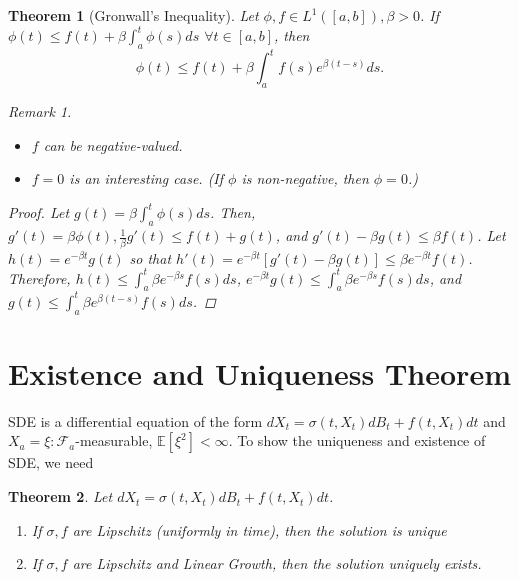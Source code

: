 \documentclass[12pt]{report}
\newcommand{\F}{\mathcal{F}}
\newcommand{\E}{\mathbb{E}}
\renewcommand{\1}{\mathbb{1}}
\theoremstyle{break}
\newtheorem{thm}{Theorem}[section] %
\theoremstyle{newdef}
\theoremstyle{remark}
\newtheorem*{rem}{Remark} %
\begin{document}
\begin{thm}[Gronwall's Inequality]
Let $\phi, f \in L^1([a,b]), \beta > 0$.
If $\phi(t) \leq f(t) + \beta \int_a^t \phi(s)ds$ $\forall t\in[a,b]$, then
$$
\phi(t) \leq f(t) + \beta\int_a^t f(s)e^{\beta(t-s)}ds.
$$

\begin{rem}
\leavevmode
\begin{itemize}
\item $f$ can be negative-valued.
\item $f = 0$ is an interesting case.
(If $\phi$ is non-negative, then $\phi = 0$.)
\end{itemize}
\end{rem}

\begin{proof}
Let $g(t) = \beta\int_a^t \phi(s)ds$.
Then, $g'(t) = \beta\phi(t), \frac{1}{\beta}g'(t) \leq f(t)+g(t)$, and $g'(t)-\beta g(t) \leq \beta f(t)$.
Let $h(t) = e^{-\beta t}g(t)$ so that
$h'(t) = e^{-\beta t}[g'(t)-\beta g(t)] \leq \beta e^{-\beta t}f(t)$.
Therefore, $h(t)  \leq \int_a^t \beta e^{-\beta s}f(s)ds$,
$e^{-\beta t}g(t) \leq \int_a^t \beta e^{-\beta s}f(s)ds$, and
$g(t) \leq \int_a^t \beta e^{\beta(t-s)}f(s)ds$.
\end{proof}
\end{thm}

\setcounter{section}{2}
\section{Existence and Uniqueness Theorem}


SDE is a differential equation of the form $dX_t = \sigma(t,X_t)dB_t + f(t,X_t)dt$ and $X_a = \xi: \F_a$-measurable, $\E[\xi^2] < \infty$.
To show the uniqueness and existence of SDE, we need

\begin{thm}
Let $dX_t = \sigma(t,X_t)dB_t + f(t,X_t)dt$.
\begin{enumerate}
\item
If $\sigma, f$ are Lipschitz (uniformly in time), then the solution is unique

\item
If $\sigma, f$ are Lipschitz and Linear Growth, then the solution uniquely exists.
\end{enumerate}
\end{thm}
\end{document}
